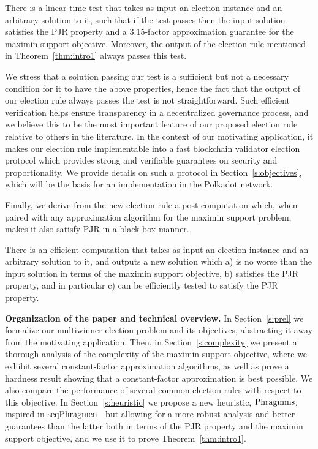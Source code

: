 \begin{theorem}\label{thm:intro2}
There is a linear-time test that takes as input an election instance and an arbitrary solution to it, such that if the test passes then the input solution satisfies the PJR property and a 3.15-factor approximation guarantee for the maximin support objective. 
Moreover, the output of the election rule mentioned in Theorem~\ref{thm:intro1} always passes this test.
\end{theorem}

We stress that a solution passing our test is a sufficient but not a necessary condition for it to have the above properties, hence the fact that the output of our election rule always passes the test is not straightforward.
Such efficient verification helps ensure transparency in a decentralized governance process, and we believe this to be the most important feature of our proposed election rule relative to others in the literature. 
In the context of our motivating application, it makes our election rule implementable into a fast blockchain validator election protocol which provides strong and verifiable guarantees on security and proportionality. 
We provide details on such a protocol in Section~\ref{s:objectives}, which will be the basis for an implementation in the Polkadot network.

Finally, we derive from the new election rule a post-computation which, when paired with any approximation algorithm for the maximin support problem, makes it also satisfy PJR in a black-box manner.

\begin{theorem}\label{thm:intro3}
There is an efficient computation that takes as input an election instance and an arbitrary solution to it, and outputs a new solution which a) is no worse than the input solution in terms of the maximin support objective, b) satisfies the PJR property, and in particular c) can be efficiently tested to satisfy the PJR property.
\end{theorem}

\textbf{Organization of the paper and technical overview.}
In Section~\ref{s:prel} we formalize our multiwinner election problem and its objectives, abstracting it away from the motivating application. Then, in Section~\ref{s:complexity} we present a thorough analysis of the complexity of the maximin support objective, where we exhibit several constant-factor approximation algorithms, as well as prove a hardness result showing that a constant-factor approximation is best possible. We also compare the performance of several common election rules with respect to this objective.
In Section~\ref{s:heuristic} we propose a new heuristic, $\operatorname{Phragmms}$, inspired in $\operatorname{seqPhragmen}$~\cite{brill2017phragmen} but allowing for a more robust analysis and better guarantees than the latter both in terms of the PJR property and the maximin support objective, and we use it to prove Theorem~\ref{thm:intro1}. 

